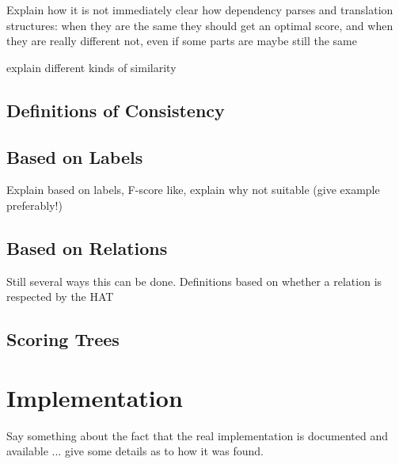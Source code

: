 \documentclass{report}
\begin{document}
Explain how it is not immediately clear how dependency parses and translation structures: when they are the same they should get an optimal score, and when they are really different not, even if some parts are maybe still the same

explain different kinds of similarity

\subsection{Definitions of Consistency}

\subsection{Based on Labels}

Explain based on labels, F-score like, explain why not suitable (give example preferably!)

\subsection{Based on Relations}

Still several ways this can be done. Definitions based on whether a relation is respected by the HAT

\subsection{Scoring Trees}

\section{Implementation}

Say something about the fact that the real implementation is documented and available ... give some details as to how it was found.



\end{document}
